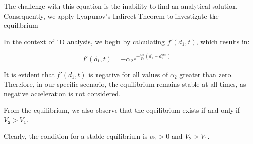 \documentclass{article}
\begin{document}
	The challenge with this equation is the inability to find an analytical solution. Consequently, we apply Lyapunov's Indirect Theorem to investigate the equilibrium.
	
	In the context of 1D analysis, we begin by calculating $f'(d_1, t)$, which results in:
	
	\[
	f'(d_1, t) = -\alpha_2e^{-\frac{\alpha_2}{V_2}(d_1 - d_{2}^{sec})}
	\]
	
	It is evident that $f'(d_1, t)$ is negative for all values of $\alpha_2$ greater than zero. Therefore, in our specific scenario, the equilibrium remains stable at all times, as negative acceleration is not considered.
	
	From the equilibrium, we also observe that the equilibrium exists if and only if $V_2 > V_1$.
	
	Clearly, the condition for a stable equilibrium is $\alpha_2 > 0$ and $V_2 > V_1$.
	
\end{document}
